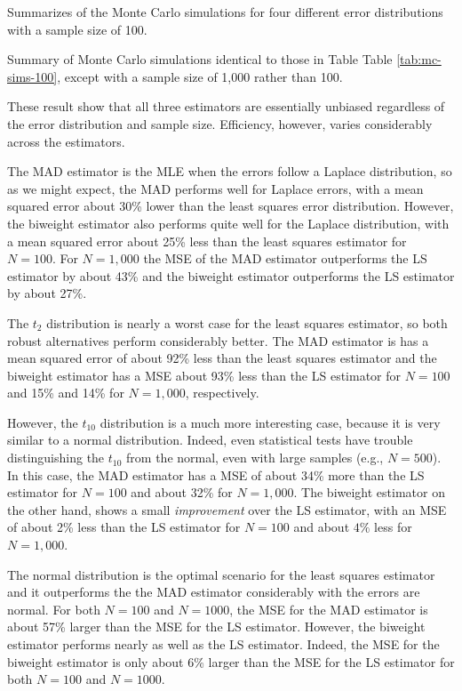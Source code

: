 \documentclass[10pt]{article}
\begin{document}
\begin{table}
{\tiny

}
\caption{Summarizes of the Monte Carlo simulations for four different error distributions with a sample size of 100.}\label{tab:mc-sims-100}
\end{table}

\begin{table}
{\tiny

}
\caption{Summary of Monte Carlo simulations identical to those in Table Table \ref{tab:mc-sims-100}, except with a sample size of 1,000 rather than 100. }\label{tab:mc-sims-1000}
\end{table}

These result show that all three estimators are essentially unbiased regardless of the error distribution and sample size. Efficiency, however, varies considerably across the estimators.

The MAD estimator is the MLE when the errors follow a Laplace distribution, so as we might expect, the MAD performs well for Laplace errors, with a mean squared error about 30\% lower than the least squares error distribution. However, the biweight estimator also performs quite well for the Laplace distribution, with a mean squared error about 25\% less than the least squares estimator for $N = 100$. For $N = 1,000$ the MSE of the MAD estimator outperforms the LS estimator by about 43\% and the biweight estimator outperforms the LS estimator by about 27\%.

The $t_2$ distribution is nearly a worst case for the least squares estimator, so both robust alternatives perform considerably better. The MAD estimator is has a mean squared error of about 92\% less than the least squares estimator and the biweight estimator has a MSE about 93\% less than the LS estimator for $N = 100$ and 15\% and 14\% for $N = 1,000$, respectively. 

However, the $t_{10}$ distribution is a much more interesting case, because it is very similar to a normal distribution. Indeed, even statistical tests have trouble distinguishing the $t_{10}$ from the normal, even with large samples (e.g., $N = 500$). In this case, the MAD estimator has a MSE of about 34\% more than the LS estimator for $N = 100$ and about 32\% for $N = 1,000$. The biweight estimator on the other hand, shows a small \textit{improvement} over the LS estimator, with an MSE of about 2\% less than the LS estimator for $N = 100$ and about $4\%$ less for $N = 1,000$.

The normal distribution is the optimal scenario for the least squares estimator and it outperforms the the MAD estimator considerably with the errors are normal. For both $N = 100$ and $N = 1000$, the MSE for the MAD estimator is about 57\% larger than the MSE for the LS estimator. However, the biweight estimator performs nearly as well as the LS estimator. Indeed, the MSE for the biweight estimator is only about 6\% larger than the MSE for the LS estimator for both $N = 100$ and $N = 1000$.
\end{document}
